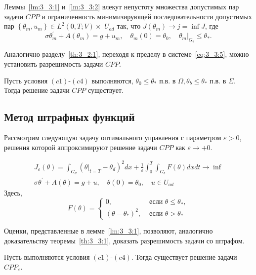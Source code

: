 Леммы~\ref{lm:3_3:1} и~\ref{lm:3_3:2} влекут
непустоту множества допустимых пар задачи $CPP$
и ограниченность минимизирующей последовательности допустимых пар
$\left\{\theta_{m}, u_{m}\right\} \in L^{2}(0, T ; V) \times$
$U_{a d}$ так, что $J\left(\theta_{m}\right) \rightarrow j=\inf J$, где
\begin{equation}
    \label{eq:3_3:5}
    \sigma \theta_{m}^{\prime}+A\left(\theta_{m}\right)=g+u_{m},
    \quad \theta_{m}(0)=\theta_{0},\left.\quad \theta_{m}\right|_{G_{b}} \leq \theta_{*}.
\end{equation}

Аналогично разделу~\ref{th:3_2:1}, переходя к пределу в системе~\eqref{eq:3_3:5},
можно установить разрешимость задачи $CPP$\@.

\begin{theorem}
    \label{th:3_3:1}
    Пусть условия $(c1)$-$(c4)$ выполняются,
    $\theta_{0} \leq \theta_{*}$ п.в. в $\Omega, \theta_{b} \leq \theta_{*}$ п.в. в $\Sigma$.
    Тогда решение задачи $CPP$ существует.
\end{theorem}

\subsection{Метод штрафных функций}\label{subsec:ch3:sec3:subsec4}
Рассмотрим следующую задачу оптимального управления с параметром $\varepsilon>0$,
решения которой аппроксимируют решение задачи $CPP$ как $\varepsilon \rightarrow+0$.
\begin{definition}
    \[
        \begin{gathered}
            J_{\varepsilon}(\theta)=\int_{G_{d}}
            \left(\left.\theta\right|_{t=T}
            -\theta_{d}\right)^{2} d x
            + \frac{1}{\varepsilon} \int_{0}^{T} \int_{G_{b}} F(\theta) d x d t \rightarrow \inf \\
            \sigma \theta^{\prime}+A(\theta)=g+u, \quad \theta(0)=\theta_{0}, \quad u \in U_{a d}
        \end{gathered}
    \]
    Здесь,
    \[
        F(\theta)=
        \begin{cases}
            0, & \text { если } \theta \leq \theta_{*}, \\
            \left(\theta-\theta_{*}\right)^{2}, & \text { если } \theta>\theta_{*}
        \end{cases}
    \]
\end{definition}
Оценки, представленные в лемме~\ref{lm:3_3:1}, позволяют, аналогично
доказательству теоремы~\ref{th:3_3:1}, доказать разрешимость задачи со штрафом.
\begin{theorem}
    \label{th:3_3:2}
    Пусть выполняются условия $(c1)$-$(c4)$.
    Тогда существует решение задачи $CPP_{\varepsilon}$.
\end{theorem}

